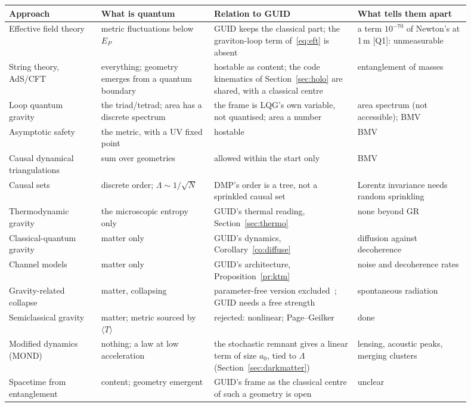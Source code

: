 \documentclass[11pt,a4paper]{article}
\theoremstyle{definition}
\theoremstyle{remark}
\newcommand{\chk}[1]{\textsf{[#1]}}
\theoremstyle{definition}
\begin{document}
\begin{center}\small
\begin{longtable}{@{}p{0.18\linewidth}p{0.22\linewidth}p{0.28\linewidth}p{0.22\linewidth}@{}}
\toprule
Approach & What is quantum & Relation to GUID & What tells them apart \\
\midrule
\endhead
Effective field theory~\cite{donoghue,bdh} & metric fluctuations below $E_P$ & GUID keeps the classical part; the graviton-loop term
of~\eqref{eq:eft} is absent & a term $10^{-70}$ of Newton's at 1\,m \chk{Q1}: unmeasurable \\
String theory, AdS/CFT~\cite{maldacena} & everything; geometry emerges from a quantum boundary & hostable as content; the code kinematics
of Section~\ref{sec:holo} are shared, with a classical centre & entanglement of masses \\
Loop quantum gravity~\cite{ashtekar,rovellismolin} & the triad/tetrad; area has a discrete spectrum & the frame is LQG's own variable, not
quantised; area a number & area spectrum (not accessible); BMV \\
Asymptotic safety~\cite{weinberg79,reuter} & the metric, with a UV fixed point & hostable & BMV \\
Causal dynamical triangulations~\cite{cdt} & sum over geometries & allowed within the start only & BMV \\
Causal sets~\cite{bombelli} & discrete order; $\Lambda\sim1/\sqrt N$ & DMP's order is a tree, not a sprinkled causal set & Lorentz
invariance needs random sprinkling \\
Thermodynamic gravity~\cite{jacobson95} & the microscopic entropy only & GUID's thermal reading, Section~\ref{sec:thermo} & none
beyond GR \\
Classical-quantum gravity~\cite{oppenheim,osswd} & matter only & GUID's dynamics, Corollary~\ref{co:diffuse} & diffusion against
decoherence \\
Channel models~\cite{ktm,tilloydiosi} & matter only & GUID's architecture, Proposition~\ref{pr:ktm} & noise and decoherence rates \\
Gravity-related collapse~\cite{diosi87,penrose96} & matter, collapsing & parameter-free version excluded~\cite{donadi}; GUID needs a free strength &
spontaneous radiation \\
Semiclassical gravity~\cite{moller,rosenfeld63} & matter; metric sourced by $\langle T\rangle$ & rejected: nonlinear; Page--Geilker &
done~\cite{pagegeilker} \\
Modified dynamics (MOND)~\cite{milgrom} & nothing; a law at low acceleration & the stochastic remnant gives a linear term of
size $a_0$, tied to $\Lambda$ (Section~\ref{sec:darkmatter}) & lensing, acoustic peaks, merging clusters \\
Spacetime from entanglement~\cite{vanraamsdonk,ermepr} & content; geometry emergent & GUID's frame as the classical centre of such a geometry is
open & unclear \\
\bottomrule
\end{longtable}
\end{center}
\end{document}

